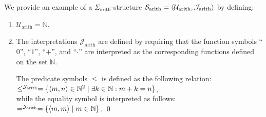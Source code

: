 \example
We provide an example of a  $\Sigma_{\mathrm{arith}}$-structure
$\mathcal{S}_{\mathrm{arith}} = \langle \mathcal{U}_{\mathrm{arith}}, \mathcal{J}_{\mathrm{arith}} \rangle$
by defining:
\begin{enumerate}
\item $\mathcal{U}_{\mathrm{arith}} = \mathbb{N}$.
\item The interpretations  $\mathcal{J}_{\mathrm{arith}}$ are defined by requiring that the function
      symbols  ``$0$'', ``$1$'', ``$\mathtt{+}$'', and ``$\cdot$'' are interpreted as the corresponding
      functions defined on the set  $\mathbb{N}$. 

      The predicate symbols $\leq$ is defined as the following relation:
      \\[0.2cm]
      \hspace*{1.3cm}
      $\leq^{\mathcal{J}_{\mathrm{arith}}} = 
       \{ \pair(m,n) \in \mathbb{N}^2\mid \exists k \in \mathbb{N}: m + k = n \}
      $,
      \\[0.2cm]
      while the equality symbol is interpreted as follows:
      \\[0.2cm]
      \hspace*{1.3cm}  
      $=^{\mathcal{J}_{\mathrm{arith}}} = \{ \pair(m,m) \mid m \in \mathbb{N}  \}$.
      \qed
\end{enumerate}

